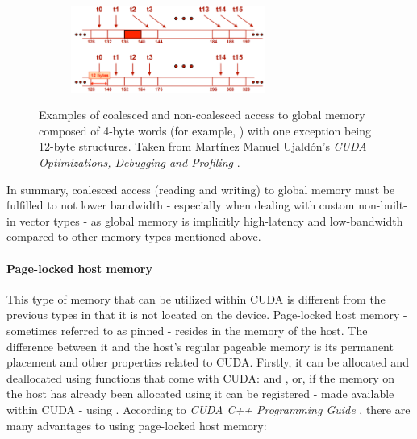 \begin{figure}[ht!]
	\begin{subfigure}{\textwidth}
		\centering
		\hspace*{-0.8cm}
		\includegraphics[width=0.7\textwidth, keepaspectratio]{images/ch1/CUDA_global_memory_non-coalesced_access-2.png}
		\label{Sub-figure:theory-CUDA-global-memory-non-coalesced-access-2}
	\end{subfigure}
	\caption{Examples of coalesced and non-coalesced access to global memory composed of 4-byte words (for example, ) with one exception being 12-byte structures. Taken from Martínez Manuel Ujaldón's \emph{CUDA Optimizations, Debugging and Profiling} \cite{xUOrKLpxlGjvTonr}.}
	\label{Figure:theory-CUDA-global-memory-non-coalesced-access-examples}
\end{figure}

In summary, coalesced access (reading and writing) to global memory must be fulfilled to not lower bandwidth - especially when dealing with custom non-built-in vector types - as global memory is implicitly high-latency and low-bandwidth compared to other memory types mentioned above.

\paragraph{Page-locked host memory}\label{Paragraph:theory-CUDA-memory-management-page-locked-host-memory}
This type of memory that can be utilized within CUDA is different from the previous types in that it is not located on the device. Page-locked host memory - sometimes referred to as pinned - resides in the memory of the host. The difference between it and the host's regular pageable memory is its permanent placement and other properties related to CUDA. Firstly, it can be allocated and deallocated using functions that come with CUDA:  and , or, if the memory on the host has already been allocated using  it can be registered - made available within CUDA - using . According to \emph{CUDA C++ Programming Guide} \cite{NVIDIAMay2022}, there are many advantages to using page-locked host memory:

